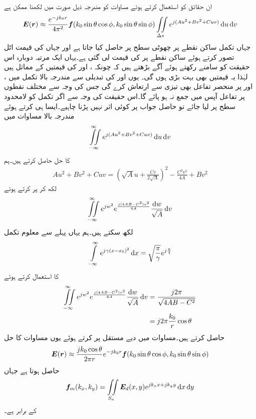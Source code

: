ان حقائق کو استعمال کرتے ہوئے مساوات  کو مندرجہ ذیل صورت میں لکھنا ممکن ہے
\begin{align}
\kvec{E}(\kvec{r}) \approx \frac{e^{-jk_0 r}}{4\pi^2}\kvec{f}(k_0 \sin \theta \cos \phi,k_0 \sin\theta\sin\phi)\iint \limits_{\Delta s} e^{j (A u^2+ B v^2+C uv)} \dif u \dif v
\end{align}
جہاں تکمل  ساکن نقطے پر چھوٹی سطح  پر حاصل کیا جاتا ہے اور جہاں  کی قیمت اٹل تصور کرتے ہوئے ساکن نقطے پر  کی قیمت لی گئی ہے۔یہاں ایک مرتبہ دوبارہ اس حقیقت کو سامنے رکھتے ہوئے آگے بڑھتے ہیں کہ چونکہ ،  اور  کی قیمتیں  کے مماثل ہیں لہٰذا یہ قیمتیں بھی بہت بڑی ہوں گی۔ یوں  اور  کی تبدیلی سے مندرجہ بالا تکمل میں ،  اور  پر منحصر تفاعل بھی تیزی سے ارتعاش کرے گی جس کی وجہ سے مختلف نقطوں پر تفاعل آپس میں جمع نہ ہو پائے گا۔اس حقیقت کی وجہ سے اگر تکمل کو لامحدود سطح پر لیا جائے تو حاصل جواب پر کوئی اثر نہیں پڑنا چاہیے۔ایسا ہی کرتے ہوئے مندرجہ بالا مساوات میں
\begin{align}
\iint \limits_{-\infty}^{\infty} e^{j (A u^2+ B v^2+C uv)} \dif u \dif v
\end{align}
کا حل حاصل کرتے ہیں۔ہم
\begin{align*}
A u^2+Bv^2+Cuv=\left(\sqrt{A} u +\frac{C v}{2\sqrt{A}} \right)^2-\frac{C^2 v^2}{4A}+Bv^2
\end{align*}
لکھ کر  پر کرتے ہوئے
\begin{align}
\iint \limits_{-\infty}^{\infty} e^{j w^2}e^{\frac{j(4AB-C^2)v^2}{4A}} \frac{\dif w}{\sqrt{A}} \dif v
\end{align}
لکھ سکتے ہیں۔ہم یہاں پہلے سے معلوم تکمل
\begin{align}
\int\limits_{-\infty}^{\infty}e^{j \gamma(x-x_0)^2} \dif x=\sqrt{\frac{\pi}{\gamma}} e^{j \frac{\pi}{4}}
\end{align}
کا استعمال کرتے ہوئے
 \begin{align*}
\iint \limits_{-\infty}^{\infty} e^{j w^2}e^{\frac{j(4AB-C^2)v^2}{4A}} \frac{\dif w}{\sqrt{A}} \dif v&=\frac{j 2\pi}{\sqrt{4AB-C^2}}\\
&=j 2\pi \frac{k_0}{r}\cos \theta
\end{align*}
حاصل کرتے ہیں۔مساوات  میں دیے مستقل پر کرتے ہوئے یوں مساوات  کا حل 
\begin{align}\label{مساوات_اینٹینا_فوریئر_بدل}
{\ensuremath{{\boldsymbol{E}}}}({{\boldsymbol{r}}})\approx \frac{j k_0 \cos \theta}{2\pi r} e^{-j k_0 r}{{\boldsymbol{f}}}(k_0 \sin \theta \cos \phi,k_0 \sin\theta \sin\phi)
\end{align}
حاصل ہوتا ہے جہاں
\begin{align}
\kvec{f}_m(k_x,k_y)=\iint\limits_{S_a} \kvec{E}_d(x,y) e^{j k_x x +j k_y y} \dif x \dif y
\end{align}
کے برابر ہے۔

